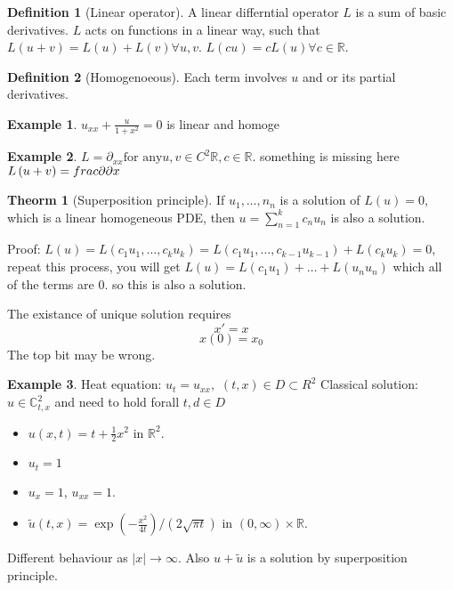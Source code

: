 \documentclass[a4paper]{article}
\theoremstyle{definition}
\newtheorem{definition}{Definition}
\newtheorem{example}{Example}
\newtheorem{theorem}{Theorm}
\begin{document}
	\begin{definition}[Linear operator]
		A linear differntial operator $L$ is a sum of basic derivatives. $L$ acts on functions in a linear way, such that $L\left( u+v \right) =L\left( u \right) +L\left( v \right) \forall u,v$. $L\left( cu \right) =cL\left( u \right) \forall c \in \mathbb{R}$. 
	\end{definition}
	\begin{definition}[Homogenoeous]
		Each term involves $u$ and or its partial derivatives. 
	\end{definition}
	\begin{example}
$u_{x x }+\frac{u}{1+x^2}=0$ is linear and homoge	
	\end{example}
	\begin{example}
	$L=\partial _{x x } \text{for any} u,v\in C^2 \mathbb{R},c\in \mathbb{R}$. 
something is missing here
		$L\left( u+v \right) =\\frac{\partial  }{\partial x} 	$
	\end{example}
	\begin{theorem}[Superposition principle]
		If $u_1, \ldots, n_{n}$ is a solution of $L\left( u \right) =0$, which is a linear homogeneous PDE, then $u=\sum_{n=1}^{k} c_nu_n $ is also a solution. 
	\end{theorem}
	Proof: $L\left( u \right) =L\left( c_1u_1, \ldots,c_ku_k \right) =L\left( c_1u_1, \ldots , c_{k-1}u_{k-1} \right) +L(c_{k}u_k)=0$, repeat this process, you will get $L\left( u \right) =L\left( c_1u_1 \right) + \ldots + L\left( u_nu_n \right) $ which all of the terms are 0. so this is also a solution. 

	The existance of unique solution requires 
	\begin{equation}
		x'=x
	\end{equation} 
	\begin{equation}
		x\left( 0 \right) =x_0
	\end{equation} 
	The top bit may be wrong. 

	\begin{example}
		Heat equation: $u_t=u_{x x},$ $(t,x)\in D\subset R^2$
		Classical solution: $u\in \mathbb{C}^2_{t,x}$ and 
		need to hold forall $t,d \in D$
		\begin{itemize}
			\item 
		$u\left( x,t \right) =t+\frac{1}{2}x^2$ in $\mathbb{R}^2$. 
	\item
		$u_t=1$
	\item 
		$u_x=1$, $u_{x x }=1$. 
	\item
		$\tilde{u}\left( t,x \right) =\exp\left( -\frac{x^2}{4t} \right) / \left( 2\sqrt{\pi t}  \right) \text{ in }\left( 0,\infty \right) \times  \mathbb{R} $. 
		\end{itemize}

		Different behaviour as $\left|x \right|\to \infty $. Also $u+\tilde{u}$ is a solution by superposition principle. 
	\end{example}
\end{document}
